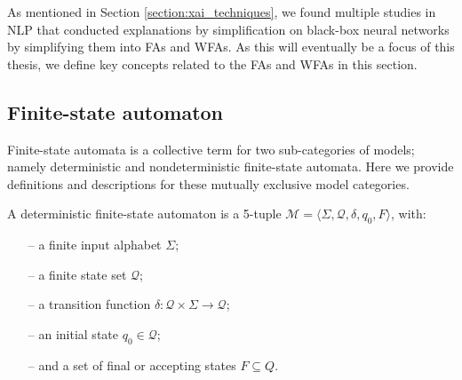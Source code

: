 \label{section:fa}

As mentioned in Section \ref{section:xai_techniques}, we found multiple studies
in NLP that conducted explanations by simplification on black-box neural
networks by simplifying them into FAs and WFAs. As this will eventually be a
focus of this thesis, we define key concepts related to the FAs and WFAs in this
section.

\subsection{Finite-state automaton}

Finite-state automata is a collective term for two sub-categories of models;
namely deterministic and nondeterministic finite-state automata. Here we provide
definitions and descriptions for these mutually exclusive model categories.

\begin{definition}
  \label{def:fa}
  A deterministic finite-state automaton is a 5-tuple $\mathcal{M} = \langle
  \Sigma, \mathcal{Q}, \delta, q_0, F \rangle$, with:
  \begin{itemize}
    \itemsep0em
    \item[--] a finite input alphabet $\Sigma$;
    \item[--] a finite state set $\mathcal{Q}$;
    \item[--] a transition function $\delta: \mathcal{Q} \times \Sigma
    \rightarrow \mathcal{Q}$;
    \item[--] an initial state $q_0 \in \mathcal{Q}$;
    \item[--] and a set of final or accepting states $F \subseteq Q$.
  \end{itemize}
\end{definition}

